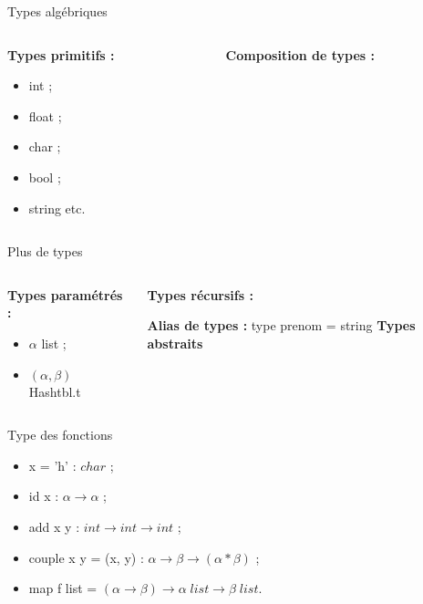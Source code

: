 \documentclass{beamer}
\begin{document}
  \begin{frame}{Types algébriques}

    \begin{columns}[t]
      \begin{column}{5cm}
        \textbf{Types primitifs :}
        \begin{itemize}
          \item int ;
          \item float ;
          \item char ;
          \item bool ;
          \item string etc.
        \end{itemize}
      \end{column}
      \begin{column}{5cm}
        \textbf{Composition de types :}
          
      \end{column}
    \end{columns}

  \end{frame}

	\begin{frame}{Plus de types}
    \begin{columns}[t]
      \begin{column}{4cm}
        \textbf{Types paramétrés :}
        
        \begin{itemize}
          \item $\alpha$ list ;
          \item $(\alpha, \beta)$ Hashtbl.t
        \end{itemize}
      \end{column}
      \begin{column}{6cm}
        \textbf{Types récursifs :}
          
        \textbf{Alias de types :}\newline
        type prenom = string \newline
        \textbf{Types abstraits}
      \end{column}
    \end{columns}
  \end{frame}

  \begin{frame}{Type des fonctions}
    \begin{itemize}
      \item x = 'h' : $char$ ;
      \item id x : $\alpha \rightarrow \alpha$ ;
      \item add x y : $int \rightarrow int \rightarrow int$ ;
      \item couple x y = (x, y) : $\alpha \rightarrow \beta \rightarrow (\alpha * \beta)$ ;
      \item map f list = $(\alpha \rightarrow \beta) \rightarrow \alpha \; list \rightarrow \beta \; list$.
    \end{itemize}
  \end{frame}
\end{document}
